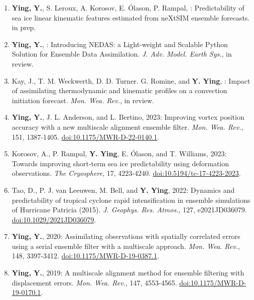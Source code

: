 \begin{enumerate}
\item \textbf{Ying, Y.}, S. Leroux, A. Korosov, E. Ólason, P. Rampal, : Predictability of sea ice linear kinematic features estimated from neXtSIM ensemble forecasts. 
in prep.

\item \textbf{Ying, Y.}, : Introducing NEDAS: a Light-weight and Scalable Python Solution for Ensemble Data Assimilation. 
\textit{J. Adv. Model. Earth Sys.}, in review.

\item Kay, J., T. M. Weckwerth, D. D. Turner. G. Romine, and \textbf{Y. Ying}, : Impact of assimilating thermodynamic and kinematic profiles on a convection initiation forecast. 
\textit{Mon. Wea. Rev.}, in review.

\item \textbf{Ying, Y.}, J. L. Anderson, and L. Bertino, 2023: Improving vortex position accuracy with a new multiscale alignment ensemble filter. 
\textit{Mon. Wea. Rev.}, 151, 1387-1405. 
\href{https://doi.org/10.1175/MWR-D-22-0140.1}{doi:10.1175/MWR-D-22-0140.1}.

\item Korosov, A., P. Rampal, \textbf{Y. Ying}, E. Ólason, and T. Williams, 2023: Towards improving short-term sea ice predictability using deformation observations. 
\textit{The Cryosphere}, 17, 4223-4240. 
\href{https://doi.org/10.5194/tc-17-4223-2023}{doi:10.5194/tc-17-4223-2023}.

\item Tao, D., P. J. van Leeuwen, M. Bell, and \textbf{Y. Ying}, 2022: Dynamics and predictability of tropical cyclone rapid intensification in ensemble simulations of Hurricane Patricia (2015). 
\textit{J. Geophys. Res. Atmos.}, 127, e2021JD036079. 
\href{https://doi.org/10.1029/2021JD036079}{doi:10.1029/2021JD036079}.

\item \textbf{Ying, Y.}, 2020: Assimilating observations with spatially correlated errors using a serial ensemble filter with a multiscale approach. 
\textit{Mon. Wea. Rev.}, 148, 3397-3412. 
\href{https://doi.org/10.1175/MWR-D-19-0387.1}{doi:10.1175/MWR-D-19-0387.1}.

\item \textbf{Ying, Y.}, 2019: A multiscale alignment method for ensemble filtering with displacement errors. 
\textit{Mon. Wea. Rev.}, 147, 4553-4565. 
\href{https://doi.org/10.1175/MWR-D-19-0170.1}{doi:10.1175/MWR-D-19-0170.1}.


\end{enumerate}
